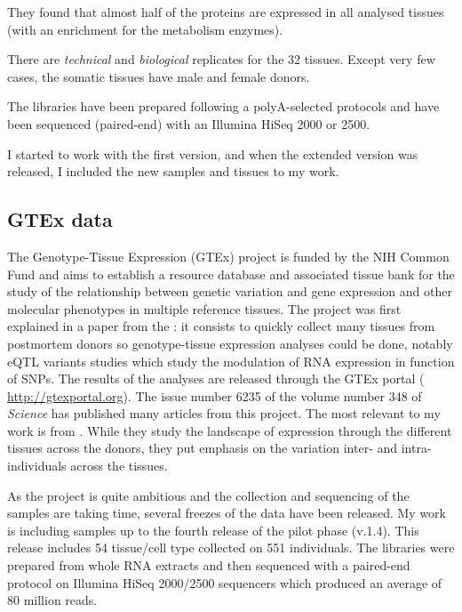 They found that almost half of the proteins are expressed in all analysed tissues
(with an enrichment for the metabolism enzymes).

There are \emph{technical} and \emph{biological} replicates for the 32 tissues.
Except very few cases, the somatic tissues have male and female donors.

The libraries have been prepared following a polyA-selected protocols and have
been sequenced (paired-end) with an Illumina HiSeq 2000 or 2500.

I started to work with the first version, and when the extended version was
released, I included the new samples and tissues to my work.

\subsection{GTEx data}

The Genotype-Tissue Expression (\gls{GTEx}) project is funded by the NIH Common
Fund and aims to establish a resource database and associated tissue bank
for the study of the relationship between genetic variation and gene expression
and other molecular phenotypes in multiple reference tissues. The project was first
explained in a paper from the \cite{GTEx2013}: it consists to quickly collect
many tissues from postmortem donors so genotype-tissue expression analyses could
be done, notably \gls{eQTL} variants studies which study the modulation
of \gls{RNA} expression in function of \glspl{SNP}. The results of the
analyses are released through the GTEx portal (%
\href{http://gtexportal.org}{http://gtexportal.org}). The issue number 6235 of
the volume number 348 of \emph{Science} has published
many articles from this project. The most relevant to my work is
 from \cite{GTExTranscript}. While they study
the landscape of expression through the different tissues across the donors, they
put emphasis on the variation inter- and intra-individuals across the tissues.

As the project is quite ambitious and the collection and sequencing of the samples
are taking time, several freezes of the data have been released. My work is
including samples up to the fourth release of the pilot phase (v.1.4). This
release includes 54 tissue/cell type collected on 551 individuals.
The libraries were prepared from whole \gls{RNA} extracts and then sequenced
with a paired-end protocol on Illumina HiSeq 2000/2500 sequencers which produced
an average of 80 million reads.

